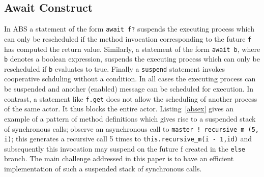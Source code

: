 





\subsection{Await Construct}
In ABS a statement of the form \texttt{await f?}
suspends the executing process which can only be rescheduled if the method
invocation corresponding to the future \texttt{f} has computed the return value.
Similarly, a statement of the form \texttt{await b}, where \texttt{b} denotes a boolean expression, suspends the executing process which can only be rescheduled if \texttt{b} evaluates to true. Finally a \texttt{suspend} statement invokes cooperative schduling without a condition. In all cases the executing process can be suspended and another (enabled) message can be scheduled for execution.
In contrast, a statement like \texttt{f.get} does not allow the scheduling of
another process of the same actor. It thus blocks the entire actor. Listing~\ref{absex} gives an example of a pattern of method definitions which gives rise to a suspended stack of synchronous calls; observe an asynchronous call to \texttt{master ! recursive\_m (5, i)}; this generates a recursive call 5 times to \texttt{this.recursive\_m(i - 1,id)} and subsequently this invocation may suspend on the future f created in the \texttt{else} branch. The main challenge addressed in this paper is to have an efficient implementation of such a suspended stack of synchronous calls.

